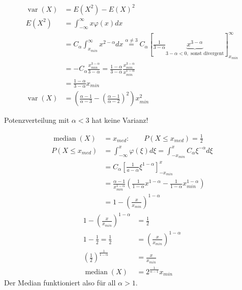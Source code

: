 \documentclass[10pt,a4paper]{scrartcl}
\DeclareMathOperator{\var}{var}
\DeclareMathOperator{\median}{median}
\begin{document}
\begin{align*}
    \var(X) & = E(X^2) - E(X)^2 \\
    E(X^2)  & = \int_{-\infty}^\infty x \varphi(x) dx \\
            & = C_\alpha \int_{x_{min}}^\infty x^{2-\alpha} dx 
             \stackrel{\alpha\neq3}{=} C_\alpha \left[ \frac{1}{3-\alpha} \underbrace{x^{3-\alpha}}_{3-\alpha < 0, \text{ sonst divergent}} \right]_{x_{min}}^\infty \\
            & = -C_\alpha \frac{x_{min}^{3-\alpha}}{3-\alpha} = \frac{1-\alpha}{3-\alpha} \frac{x_{min}^{3-\alpha}}{x_{min}^{1-\alpha}} \\
            & = \frac{1-\alpha}{3-\alpha} x_{min} \\
    \var(X) & = \left( \frac{\alpha-1}{\alpha-3} - \left(\frac{\alpha-1}{\alpha-2}\right)^2 \right) x_{min}^2
\end{align*}

Potenzverteilung mit $\alpha < 3$ hat keine Varianz!

\begin{align*}
         \median(X) & = x_{med} : \qquad P(X \le x_{med}) = \frac{1}{2} \\
    P(X\le x_{med}) & = \int_{-\infty}^x \varphi(\xi)d\xi = \int_{-x_{min}}^x C_\alpha \xi^{-\alpha} d\xi \\
                    & = C_\alpha \left[\frac{1}{a-\alpha} \xi^{1-\alpha}\right]_{-x_{min}}^x \\
                    & = \frac{\alpha-1}{x_{min}^{1-\alpha}} \left(\frac{1}{1-\alpha} x^{1-\alpha} - \frac{1}{1-\alpha} x_{min}^{1-\alpha}\right)\\
                    & = 1 - \left(\frac{x}{x_{min}}\right)^{1-\alpha}
\end{align*}
\begin{align*}
         1 - \left(\frac{x}{x_{min}}\right)^{1-\alpha} &= \frac{1}{2} \\
         1-\frac{1}{2} = \frac{1}{2} & = \left(\frac{x}{x_{min}}\right)^{1-\alpha} \\
         \left(\frac{1}{2}\right)^{\frac{1}{1-\alpha}} & = \frac{x}{x_{min}} \\
         \median(X) & = 2^{\frac{1}{\alpha-1}} x_{min}
\end{align*}
Der Median funktioniert also für all $\alpha>1$.
\fi
\end{document}
